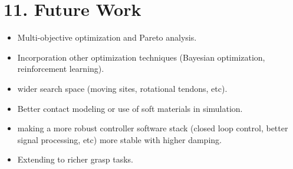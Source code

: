 \documentclass[12pt,a4paper]{article}
\begin{document}
\section*{11. Future Work}
\begin{itemize}
  \item Multi-objective optimization and Pareto analysis.
  \item Incorporation other optimization techniques (Bayesian optimization, reinforcement learning).
  \item wider search space (moving sites, rotational tendons, etc).
  \item Better contact modeling or use of soft materials in simulation.
  \item making a more robust controller software stack (closed loop control, better signal processing, etc) more stable with higher damping.
  \item Extending to richer grasp tasks.
\end{itemize}
\end{document}
